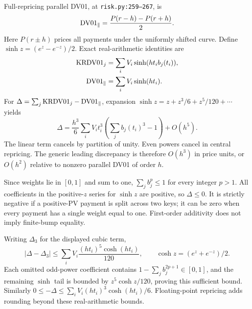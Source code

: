 \documentclass[12pt,a4paper]{article}
\begin{document}
Full-repricing parallel DV01, at \texttt{risk.py:259--267}, is
\begin{equation}
 {\rm DV01}_{\parallel}=\frac{P(r-h)-P(r+h)}2.
\end{equation}
Here $P(r\pm h)$ prices all payments under the uniformly shifted curve.
Define $\sinh z=(e^z-e^{-z})/2$. Exact real-arithmetic identities are
\begin{align}
 {\rm KRDV01}_j&=\sum_i V_i\sinh(h t_i b_j(t_i)),\\
 {\rm DV01}_{\parallel}&=\sum_i V_i\sinh(h t_i).
\end{align}
For $\Delta=\sum_j{\rm KRDV01}_j-{\rm DV01}_{\parallel}$, expansion
$\sinh z=z+z^3/6+z^5/120+\cdots$ yields
\begin{equation}\label{eq:cubic}
 \Delta=\frac{h^3}{6}\sum_i V_i t_i^3
       \left(\sum_j b_j(t_i)^3-1\right)+O(h^5).
\end{equation}
The linear term cancels by partition of unity. Even powers cancel in
central repricing. The generic leading discrepancy is therefore
$O(h^3)$ in price units, or $O(h^2)$ relative to nonzero parallel DV01
of order $h$.

Since weights lie in $[0,1]$ and sum to one,
$\sum_j b_j^p\leq1$ for every integer $p>1$.
All coefficients in the positive-$z$ series for $\sinh z$ are positive,
so $\Delta\leq0$. It is strictly negative if a positive-PV payment is
split across two keys; it can be zero when every payment has a single
weight equal to one. First-order additivity does not imply finite-bump equality.

Writing $\Delta_3$ for the displayed cubic term,
\begin{equation}
 |\Delta-\Delta_3|\leq
 \sum_i V_i\frac{(h t_i)^5\cosh(h t_i)}{120},
 \qquad \cosh z=(e^z+e^{-z})/2.
\end{equation}
Each omitted odd-power coefficient contains
$1-\sum_j b_j^{2p+1}\in[0,1]$, and the remaining $\sinh$ tail is bounded
by $z^5\cosh z/120$, proving this sufficient bound.
Similarly $0\leq-\Delta\leq\sum_i V_i(h t_i)^3\cosh(h t_i)/6$.
Floating-point repricing adds rounding beyond these real-arithmetic bounds.
\end{document}
